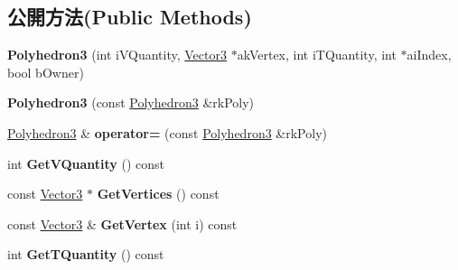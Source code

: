 \subsection*{公開方法(Public Methods)}
\begin{DoxyCompactItemize}
\item 
{\bfseries Polyhedron3} (int i\+V\+Quantity, \hyperlink{class_magnum_1_1_vector3}{Vector3} $\ast$ak\+Vertex, int i\+T\+Quantity, int $\ast$ai\+Index, bool b\+Owner)\hypertarget{class_magnum_1_1_polyhedron3_a597b3c62411632b0b7ec097f187aedba}{}\label{class_magnum_1_1_polyhedron3_a597b3c62411632b0b7ec097f187aedba}

\item 
{\bfseries Polyhedron3} (const \hyperlink{class_magnum_1_1_polyhedron3}{Polyhedron3} \&rk\+Poly)\hypertarget{class_magnum_1_1_polyhedron3_adef375042667395797400f6aee73c576}{}\label{class_magnum_1_1_polyhedron3_adef375042667395797400f6aee73c576}

\item 
\hyperlink{class_magnum_1_1_polyhedron3}{Polyhedron3} \& {\bfseries operator=} (const \hyperlink{class_magnum_1_1_polyhedron3}{Polyhedron3} \&rk\+Poly)\hypertarget{class_magnum_1_1_polyhedron3_aa4ceab55c6b3b63dfed4a97dc95f670c}{}\label{class_magnum_1_1_polyhedron3_aa4ceab55c6b3b63dfed4a97dc95f670c}

\item 
int {\bfseries Get\+V\+Quantity} () const \hypertarget{class_magnum_1_1_polyhedron3_ad1b59fc9105e3780b4234ac37b2291d5}{}\label{class_magnum_1_1_polyhedron3_ad1b59fc9105e3780b4234ac37b2291d5}

\item 
const \hyperlink{class_magnum_1_1_vector3}{Vector3} $\ast$ {\bfseries Get\+Vertices} () const \hypertarget{class_magnum_1_1_polyhedron3_a1d8c1ed8694ec07884d25cab99439da4}{}\label{class_magnum_1_1_polyhedron3_a1d8c1ed8694ec07884d25cab99439da4}

\item 
const \hyperlink{class_magnum_1_1_vector3}{Vector3} \& {\bfseries Get\+Vertex} (int i) const \hypertarget{class_magnum_1_1_polyhedron3_a20deb551ce84982c3beac83ecfe72c38}{}\label{class_magnum_1_1_polyhedron3_a20deb551ce84982c3beac83ecfe72c38}

\item 
int {\bfseries Get\+T\+Quantity} () const \hypertarget{class_magnum_1_1_polyhedron3_a3b8e25ad278c667643a6af0f7c143c81}{}\label{class_magnum_1_1_polyhedron3_a3b8e25ad278c667643a6af0f7c143c81}


\end{DoxyCompactItemize}

